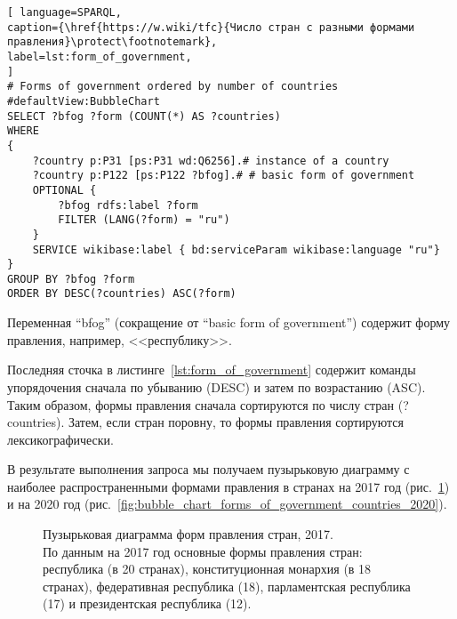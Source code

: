 \begin{lstlisting}[ language=SPARQL, 
caption={\href{https://w.wiki/tfc}{Число стран с разными формами правления}\protect\footnotemark},
label=lst:form_of_government, 
]
# Forms of government ordered by number of countries
#defaultView:BubbleChart
SELECT ?bfog ?form (COUNT(*) AS ?countries)
WHERE 
{
	?country p:P31 [ps:P31 wd:Q6256].# instance of a country
	?country p:P122 [ps:P122 ?bfog].# # basic form of government
	OPTIONAL {
		?bfog rdfs:label ?form
		FILTER (LANG(?form) = "ru")
	}
	SERVICE wikibase:label { bd:serviceParam wikibase:language "ru"}
}
GROUP BY ?bfog ?form
ORDER BY DESC(?countries) ASC(?form)
\end{lstlisting}


Переменная ``bfog'' (сокращение от ``basic form of government'') содержит форму правления, например, <<республику>>. 

Последняя сточка в листинге~\ref{lst:form_of_government} содержит команды упорядочения сначала по убыванию (DESC) и затем по возрастанию (ASC). Таким образом, формы правления сначала сортируются по числу стран (?countries). Затем, если стран поровну, то формы правления сортируются  лексикографически\protect\footnotemark. 


В результате выполнения запроса мы получаем пузырьковую диаграмму с наиболее распространенными формами правления в странах на 2017 год (рис.~\ref{fig:bubble_chart_forms_of_government_countries_2017}) и на 2020 год (рис.~\ref{fig:bubble_chart_forms_of_government_countries_2020}).

\begin{figure}
	{
		\setlength{\fboxsep}{0pt}%
		\setlength{\fboxrule}{1pt}%
	}
	\caption{Пузырьковая диаграмма форм правления стран, 2017.
		\\			
		По данным на 2017 год основные формы правления стран: республика (в 20 странах), конституционная монархия (в 18 странах), федеративная республика (18), парламентская республика (17) и президентская республика (12).}%
	\label{fig:bubble_chart_forms_of_government_countries_2017}%
\end{figure}

